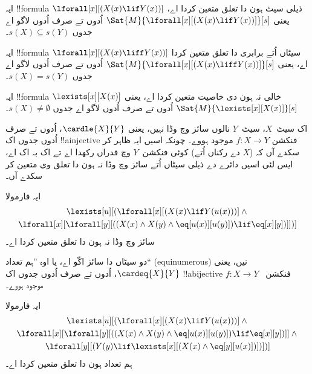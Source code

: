 \documentclass[../../../include/open-logic-section]{subfiles}
\begin{document}


\begin{prop}
ایہ !!{formula} $\lforall[x][(X(x) \lif Y(x))]$ ذیلی سیٹ ہون دا
تعلق متعین کردا اے، یعنی $\Sat{M}{\lforall[x][(X(x) \lif Y(x))]}[s]$
اُدوں تے صرف اُدوں لاگو اے جدوں $s(X) \subseteq s(Y)$۔
\end{prop}

\begin{prop}
ایہ !!{formula} $\lforall[x][(X(x) \liff Y(x))]$ سیٹاں اُتے
برابری دا تعلق متعین کردا اے، یعنی
$\Sat{M}{\lforall[x][(X(x) \liff Y(x))]}[s]$
اُدوں تے صرف اُدوں لاگو اے جدوں $s(X) = s(Y)$۔
\end{prop}

\begin{prop}
ایہ !!{formula} $\lexists[x][X(x)]$ خالی نہ ہون دی خاصیت متعین
کردا اے، یعنی $\Sat{M}{\lexists[x][X(x)]}[s]$ اُدوں تے صرف اُدوں لاگو اے جدوں
$s(X) \neq \emptyset$۔
\end{prop}

اک سیٹ~$X$، سیٹ~$Y$ نالوں سائز وچ وڈا نہیں، یعنی
$\cardle{X}{Y}$، اُدوں تے صرف اُدوں جدوں اک !!a{injective} فنکشن
$f\colon X \to Y$ موجود ہووے۔ چونکہ اسیں ایہ ظاہر کر سکدے آں کہ
($X$ دے رکناں اُتے) کوئی فنکشن~$Y$ وچ قدراں رکھدا اے تے اک بہ اک
اے، ایس لئی اسیں دائرے دے ذیلی سیٹاں اُتے سائز وچ وڈا
نہ ہون دا تعلق وی متعین کر سکدے آں۔

\begin{prop}
ایہ فارمولا
\begin{multline*}
\lexists[u][(\lforall[x][(X(x) \lif Y(u(x)))] \land {}\\
\lforall[x][\lforall[y][((X(x) \land X(y) \land \eq[u(x)][u(y)]) \lif
      \eq[x][y])]])]
\end{multline*}
سائز وچ وڈا نہ ہون دا تعلق متعین کردا اے۔
\end{prop}

دو سیٹاں دا سائز اکّو اے، یا اوہ ”ہم تعداد“ (equinumerous) نیں،
یعنی $\cardeq{X}{Y}$، اُدوں تے صرف اُدوں جدوں اک !!a{bijective} فنکشن
~$f\colon X \to Y$ موجود ہووے۔

\begin{prop}
ایہ فارمولا
\begin{multline*}
  \lexists[u][(\lforall[x][(X(x) \lif Y(u(x)))] \land {}\\
    \lforall[x][\lforall[y][((X(x) \land X(y) \land \eq[u(x)][u(y)]) \lif \eq[x][y])]]
  \land {} \\\lforall[y][(Y(y) \lif \lexists[x][(X(x)
      \land \eq[y][u(x)])])])]
\end{multline*}
ہم تعداد ہون دا تعلق متعین کردا اے۔
\end{prop}
\end{document}
